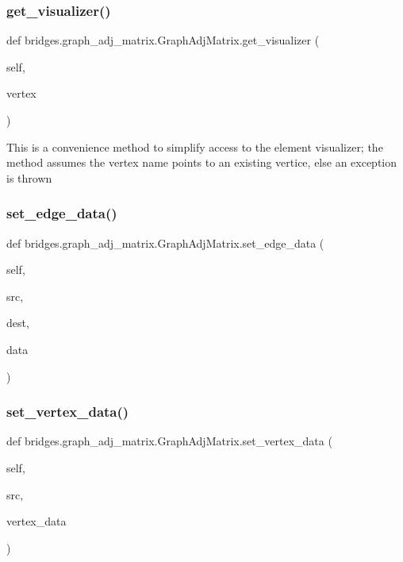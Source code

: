 \subsubsection{\texorpdfstring{get\_visualizer()}{get\_visualizer()}}
{\footnotesize\ttfamily def bridges.\+graph\+\_\+adj\+\_\+matrix.\+Graph\+Adj\+Matrix.\+get\+\_\+visualizer (\begin{DoxyParamCaption}\item[{}]{self,  }\item[{}]{vertex }\end{DoxyParamCaption})}

\begin{DoxyVerb}This is a convenience method to simplify access to the element visualizer;
the method assumes the vertex name points to an existing vertice, else an
exception is thrown
\end{DoxyVerb}
 \mbox{\label{classbridges_1_1graph__adj__matrix_1_1_graph_adj_matrix_ac456de9923ee8d671d1b6d908568b1bc}} 
\subsubsection{\texorpdfstring{set\_edge\_data()}{set\_edge\_data()}}
{\footnotesize\ttfamily def bridges.\+graph\+\_\+adj\+\_\+matrix.\+Graph\+Adj\+Matrix.\+set\+\_\+edge\+\_\+data (\begin{DoxyParamCaption}\item[{}]{self,  }\item[{}]{src,  }\item[{}]{dest,  }\item[{}]{data }\end{DoxyParamCaption})}

\mbox{\label{classbridges_1_1graph__adj__matrix_1_1_graph_adj_matrix_a96d735f98243acee1a604ed9dc990356}} 
\subsubsection{\texorpdfstring{set\_vertex\_data()}{set\_vertex\_data()}}
{\footnotesize\ttfamily def bridges.\+graph\+\_\+adj\+\_\+matrix.\+Graph\+Adj\+Matrix.\+set\+\_\+vertex\+\_\+data (\begin{DoxyParamCaption}\item[{}]{self,  }\item[{}]{src,  }\item[{}]{vertex\+\_\+data }\end{DoxyParamCaption})}

